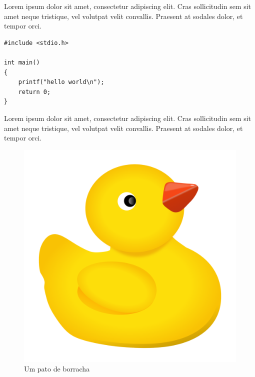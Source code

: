 \newpage

Lorem ipsum dolor sit amet, consectetur adipiscing elit.
Cras sollicitudin sem sit amet neque tristique, vel volutpat velit convallis. 
Praesent at sodales dolor, et tempor orci.
\begin{verbatim}
#include <stdio.h>

int main()
{
    printf("hello world\n");
    return 0;
}
\end{verbatim}

\newpage

Lorem ipsum dolor sit amet, consectetur adipiscing elit.
Cras sollicitudin sem sit amet neque tristique, vel volutpat velit convallis. 
Praesent at sodales dolor, et tempor orci.
\begin{figure}[hb]
    \centering
    \includegraphics[scale=0.08]{./pato.png}
    \caption{Um pato de borracha}
    \label{fig:pato}
\end{figure}
